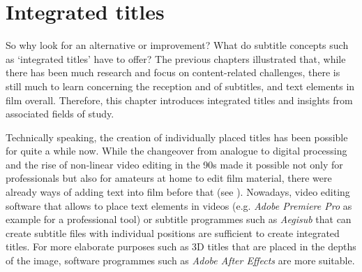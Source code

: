 \chapter{Integrated titles}\label{integrated}

So why look for an alternative or improvement? What do subtitle concepts such as ‘integrated titles’ have to offer? The previous chapters illustrated that, while there has been much research and focus on content-related challenges, there is still much to learn concerning the reception and  of subtitles, and text elements in film overall. Therefore, this chapter introduces integrated titles and insights from associated fields of study.

Technically speaking, the creation of individually placed titles has been possible for quite a while now. While the changeover from analogue to digital processing and the rise of non-linear video editing in the 90s made it possible not only for professionals but also for amateurs at home to edit film material, there were already ways of adding text into film before that (see ). Nowadays, video editing software that allows to place text elements in videos (e.g. \textit{Adobe Premiere Pro} as example for a professional tool) or subtitle programmes such as \textit{Aegisub} that can create subtitle files with individual positions are sufficient to create integrated titles. For more elaborate purposes such as 3D titles that are placed in the depths of the image, software programmes such as \textit{Adobe After Effects} are more suitable.

